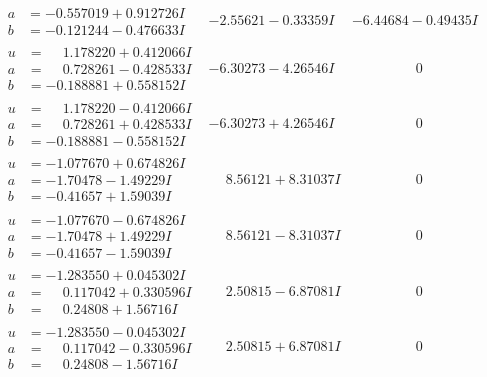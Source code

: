 \documentclass[1p]{elsarticle_modified}
\theoremstyle{definition}
\begin{document}
$$\begin{array}{c|c|c}
\begin{aligned}
a &= -0.557019 + 0.912726 I \\
b &= -0.121244 - 0.476633 I\end{aligned}
 & -2.55621 - 0.33359 I & -6.44684 - 0.49435 I \\ \hline\begin{aligned}
u &= \phantom{-}1.178220 + 0.412066 I \\
a &= \phantom{-}0.728261 - 0.428533 I \\
b &= -0.188881 + 0.558152 I\end{aligned}
 & -6.30273 - 4.26546 I & \phantom{-0.000000 } 0 \\ \hline\begin{aligned}
u &= \phantom{-}1.178220 - 0.412066 I \\
a &= \phantom{-}0.728261 + 0.428533 I \\
b &= -0.188881 - 0.558152 I\end{aligned}
 & -6.30273 + 4.26546 I & \phantom{-0.000000 } 0 \\ \hline\begin{aligned}
u &= -1.077670 + 0.674826 I \\
a &= -1.70478 - 1.49229 I \\
b &= -0.41657 + 1.59039 I\end{aligned}
 & \phantom{-}8.56121 + 8.31037 I & \phantom{-0.000000 } 0 \\ \hline\begin{aligned}
u &= -1.077670 - 0.674826 I \\
a &= -1.70478 + 1.49229 I \\
b &= -0.41657 - 1.59039 I\end{aligned}
 & \phantom{-}8.56121 - 8.31037 I & \phantom{-0.000000 } 0 \\ \hline\begin{aligned}
u &= -1.283550 + 0.045302 I \\
a &= \phantom{-}0.117042 + 0.330596 I \\
b &= \phantom{-}0.24808 + 1.56716 I\end{aligned}
 & \phantom{-}2.50815 - 6.87081 I & \phantom{-0.000000 } 0 \\ \hline\begin{aligned}
u &= -1.283550 - 0.045302 I \\
a &= \phantom{-}0.117042 - 0.330596 I \\
b &= \phantom{-}0.24808 - 1.56716 I\end{aligned}
 & \phantom{-}2.50815 + 6.87081 I & \phantom{-0.000000 } 0 \\ \hline\begin{aligned}

\end{aligned}
\end{array}$$
\end{document}
